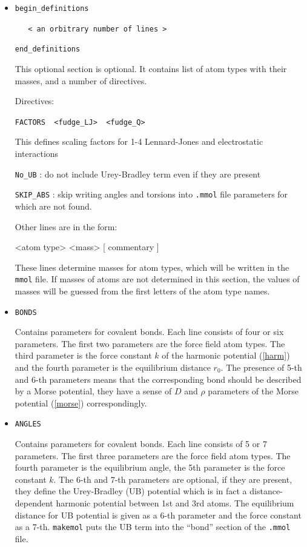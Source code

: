 \documentclass{article}
\begin{document}
\begin{itemize}

\item
\verb|begin_definitions|

\verb|   < an orbitrary number of lines >  |

\verb|end_definitions|

This optional section is optional. It contains list of atom types with 
their masses, and a number of directives.

Directives:

\verb|FACTORS  <fudge_LJ>  <fudge_Q>|

This defines scaling factors for 1-4 Lennard-Jones and electrostatic 
interactions

\verb|No_UB| : do not include Urey-Bradley term even if they are present

\verb|SKIP_ABS| : skip writing angles and torsions into \verb|.mmol| file
parameters for which are not found.

Other lines are in the form:

<atom type>   <mass>    [ commentary ]

These lines determine masses for atom types, which will be written in 
the \verb|mmol| file. If masses of atoms are not determined in this section, 
the values of masses will be guessed from the first letters of the atom 
type names.

\item
\verb|BONDS|

Contains parameters for covalent bonds. Each line consists of four or six
parameters. The first two parameters are the force field atom types.
The third parameter is the force constant $k$ of the harmonic potential
(\ref{harm}) and the fourth parameter is the equilibrium
distance $r_0$. The presence of 5-th and 6-th parameters means that
the corresponding bond should be described by a Morse potential,
they have a sense of $D$ and $\rho$ parameters of the Morse potential 
(\ref{morse}) correspondingly. 

\item
\verb|ANGLES|

Contains parameters for covalent bonds. Each line consists of 5 or 7
parameters. The first three parameters are the force field atom types.
The fourth parameter is the equilibrium angle, the 5th parameter
is the force constant $k$. The 6-th and 7-th parameters are optional,
if they are present, they define the Urey-Bradley (UB) potential which
is in fact a distance-dependent harmonic potential between 1st and 3rd
atoms. The equilibrium distance for UB potential is given as a 6-th
parameter and the force constant as a 7-th. \verb|makemol| puts the 
UB term into the ``bond'' section of the \verb|.mmol| file.


\end{itemize}
\end{document}
